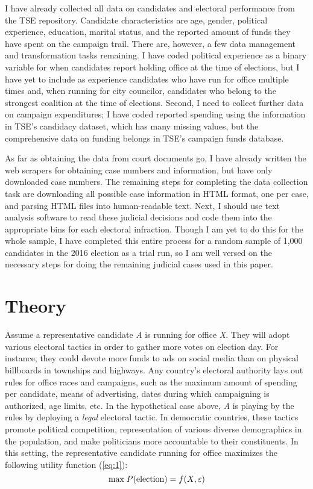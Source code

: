 \documentclass[11pt]{article}
\newcommand{\refp}[1]{(\ref{#1})}
\begin{document}
I have already collected all data on candidates and electoral performance from the TSE repository. Candidate characteristics are age, gender, political experience, education, marital status, and the reported amount of funds they have spent on the campaign trail. There are, however, a few data management and transformation tasks remaining. I have coded political experience as a binary variable for when candidates report holding office at the time of elections, but I have yet to include as experience candidates who have run for office multiple times and, when running for city councilor, candidates who belong to the strongest coalition at the time of elections. Second, I need to collect further data on campaign expenditures; I have coded reported spending using the information in TSE's candidacy dataset, which has many missing values, but the comprehensive data on funding belongs in TSE's campaign funds database.

As far as obtaining the data from court documents go, I have already written the web scrapers for obtaining case numbers and information, but have only downloaded case numbers. The remaining steps for completing the data collection task are downloading all possible case information in HTML format, one per case, and parsing HTML files into human-readable text. Next, I should use text analysis software to read these judicial decisions and code them into the appropriate bins for each electoral infraction. Though I am yet to do this for the whole sample, I have completed this entire process for a random sample of 1,000 candidates in the 2016 election as a trial run, so I am well versed on the necessary steps for doing the remaining judicial cases used in this paper.

\section{Theory} \label{sec:theory_paper1}

Assume a representative candidate \emph{A} is running for office \emph{X}. They will adopt various electoral tactics in order to gather more votes on election day. For instance, they could devote more funds to ads on social media than on physical billboards in townships and highways. Any country's electoral authority lays out rules for office races and campaigns, such as the maximum amount of spending per candidate, means of advertising, dates during which campaigning is authorized, age limits, etc. In the hypothetical case above, \emph{A} is playing by the rules by deploying a \emph{legal} electoral tactic. In democratic countries, these tactics promote political competition, representation of various diverse demographics in the population, and make politicians more accountable to their constituents. In this setting, the representative candidate running for office maximizes the following utility function \refp{eq:1}: \\
\begin{equation} \label{eq:1}
  \text{max} \thickspace P(\text{election}) = f(X, \varepsilon)
\end{equation}
\end{document}
